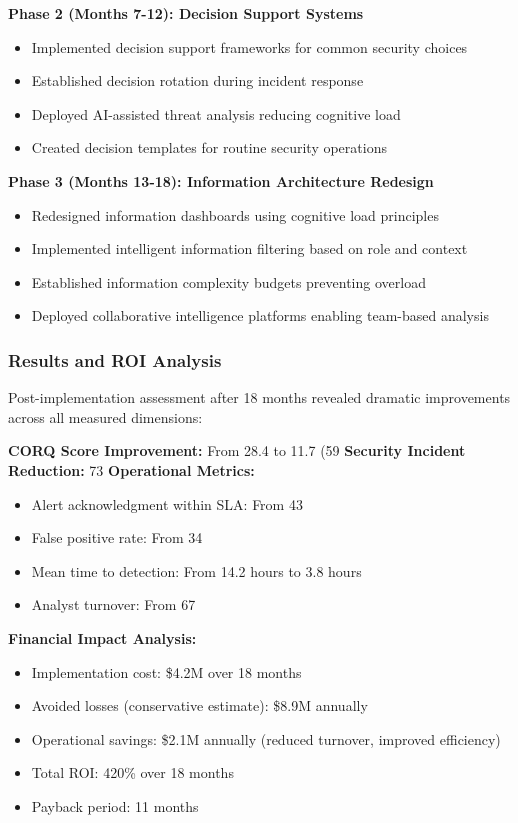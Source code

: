 \documentclass[11pt,a4paper]{article}
\begin{document}
\textbf{Phase 2 (Months 7-12): Decision Support Systems}
\begin{itemize}
\item Implemented decision support frameworks for common security choices
\item Established decision rotation during incident response
\item Deployed AI-assisted threat analysis reducing cognitive load
\item Created decision templates for routine security operations
\end{itemize}

\textbf{Phase 3 (Months 13-18): Information Architecture Redesign}
\begin{itemize}
\item Redesigned information dashboards using cognitive load principles
\item Implemented intelligent information filtering based on role and context
\item Established information complexity budgets preventing overload
\item Deployed collaborative intelligence platforms enabling team-based analysis
\end{itemize}

\subsubsection{Results and ROI Analysis}

Post-implementation assessment after 18 months revealed dramatic improvements across all measured dimensions:

\textbf{CORQ Score Improvement:} From 28.4 to 11.7 (59%
\textbf{Security Incident Reduction:} 73%
\textbf{Operational Metrics:}
\begin{itemize}
\item Alert acknowledgment within SLA: From 43%
\item False positive rate: From 34%
\item Mean time to detection: From 14.2 hours to 3.8 hours
\item Analyst turnover: From 67%
\end{itemize}

\textbf{Financial Impact Analysis:}
\begin{itemize}
\item Implementation cost: \$4.2M over 18 months
\item Avoided losses (conservative estimate): \$8.9M annually
\item Operational savings: \$2.1M annually (reduced turnover, improved efficiency)
\item Total ROI: 420\% over 18 months
\item Payback period: 11 months
\end{itemize}
\end{document}
